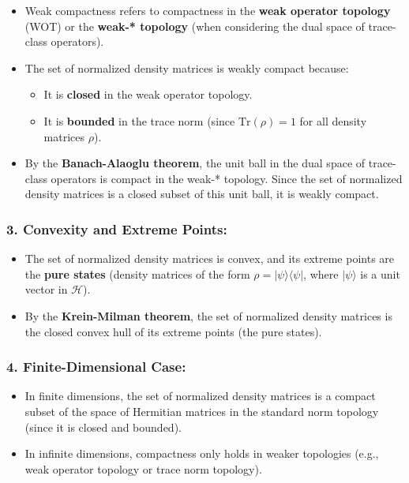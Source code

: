\documentclass{article}
\begin{document}
\begin{itemize}
\item Weak compactness refers to compactness in the \textbf{weak operator
topology} (WOT) or the \textbf{weak-* topology} (when considering the dual
space of trace-class operators). 

\item The set of normalized density matrices is weakly compact because: 

\begin{itemize}
\item It is \textbf{closed} in the weak operator topology. 

\item It is \textbf{bounded} in the trace norm (since $\text{Tr}(\rho) = 1$
for all density matrices $\rho$). 
\end{itemize}

\item By the \textbf{Banach-Alaoglu theorem}, the unit ball in the dual
space of trace-class operators is compact in the weak-* topology. Since the
set of normalized density matrices is a closed subset of this unit ball, it
is weakly compact.
\end{itemize}

\subsubsection*{3. \textbf{Convexity and Extreme Points}:}

\begin{itemize}
\item The set of normalized density matrices is convex, and its extreme
points are the \textbf{pure states} (density matrices of the form $\rho =
|\psi\rangle\langle\psi|$, where $|\psi\rangle$ is a unit vector in $%
\mathcal{H}$). 

\item By the \textbf{Krein-Milman theorem}, the set of normalized density
matrices is the closed convex hull of its extreme points (the pure states).
\end{itemize}

\subsubsection*{4. \textbf{Finite-Dimensional Case}:}

\begin{itemize}
\item In finite dimensions, the set of normalized density matrices is a
compact subset of the space of Hermitian matrices in the standard norm
topology (since it is closed and bounded). 

\item In infinite dimensions, compactness only holds in weaker topologies
(e.g., weak operator topology or trace norm topology).
\end{itemize}
\end{document}
